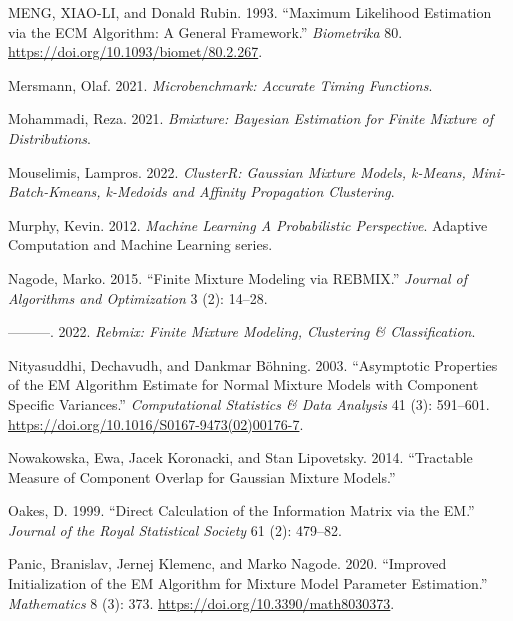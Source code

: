 \begin{CSLReferences}{1}{0}
\leavevmode{}%
MENG, XIAO-LI, and Donald Rubin. 1993. {``Maximum {Likelihood Estimation} via the {ECM Algorithm}: {A General Framework}.''} \emph{Biometrika} 80. \url{https://doi.org/10.1093/biomet/80.2.267}.

\leavevmode{}%
Mersmann, Olaf. 2021. \emph{Microbenchmark: Accurate Timing Functions}.

\leavevmode{}%
Mohammadi, Reza. 2021. \emph{Bmixture: Bayesian Estimation for Finite Mixture of Distributions}.

\leavevmode{}%
Mouselimis, Lampros. 2022. \emph{ClusterR: Gaussian Mixture Models, k-Means, Mini-Batch-Kmeans, k-Medoids and Affinity Propagation Clustering}.

\leavevmode{}%
Murphy, Kevin. 2012. \emph{Machine {Learning A Probabilistic Perspective}}. {Adaptive Computation and Machine Learning series}.

\leavevmode{}%
Nagode, Marko. 2015. {``Finite Mixture Modeling via REBMIX.''} \emph{Journal of Algorithms and Optimization} 3 (2): 14--28.

\leavevmode{}%
---------. 2022. \emph{Rebmix: Finite Mixture Modeling, Clustering \& Classification}.

\leavevmode{}%
Nityasuddhi, Dechavudh, and Dankmar Böhning. 2003. {``Asymptotic Properties of the {EM} Algorithm Estimate for Normal Mixture Models with Component Specific Variances.''} \emph{Computational Statistics \& Data Analysis} 41 (3): 591--601. \url{https://doi.org/10.1016/S0167-9473(02)00176-7}.

\leavevmode{}%
Nowakowska, Ewa, Jacek Koronacki, and Stan Lipovetsky. 2014. {``Tractable {Measure} of {Component Overlap} for {Gaussian Mixture Models}.''}

\leavevmode{}%
Oakes, D. 1999. {``Direct Calculation of the Information Matrix via the {EM}.''} \emph{Journal of the Royal Statistical Society} 61 (2): 479--82.

\leavevmode{}%
Panic, Branislav, Jernej Klemenc, and Marko Nagode. 2020. {``Improved Initialization of the EM Algorithm for Mixture Model Parameter Estimation.''} \emph{Mathematics} 8 (3): 373. \url{https://doi.org/10.3390/math8030373}.


\end{CSLReferences}
